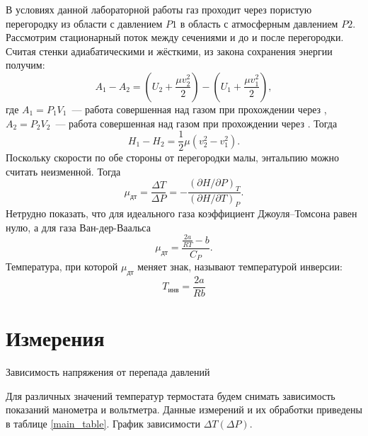 \documentclass[a4paper,12pt]{article} %
\newcommand{\RomanNumeralCaps}[1]
{\MakeUppercase{\romannumeral #1}}
\begin{document}
\noindent В условиях данной лабораторной работы газ проходит через пористую
перегородку из области с давлением $ P1 $ в область с атмосферным давлением 
$ P2 $. Рассмотрим стационарный поток между сечениями \RomanNumeralCaps{1}
и \RomanNumeralCaps{2} до и после перегородки. Считая стенки
адиабатическими и жёсткими, из закона сохранения энергии получим: 
\begin{equation}\label{}
	A_1-A_2=
	\left(U_2+\dfrac{\mu v_2^2}{2}\right)-
	\left(U_1+\dfrac{\mu v_1^2}{2}\right),
\end{equation}
где $ A_1=P_1V_1 $~--- работа совершенная над газом при прохождении
через \RomanNumeralCaps{1}, $ A_2=P_2V_2 $~--- работа совершенная над
газом при прохождении через \RomanNumeralCaps{2}. Тогда
\begin{equation}\label{}
	H_1-H_2=\dfrac{1}{2}\mu(v_2^2-v_1^2).
\end{equation}
Поскольку скорости по обе стороны от перегородки малы, энтальпию можно
считать неизменной. Тогда 
\begin{equation}\label{}
	\mu_{дт}=\dfrac{\Delta T}{\Delta P}=
	-\dfrac{(\partial H/\partial P)_T}{(\partial H/\partial T)_P}.
\end{equation}
Нетрудно показать, что для идеального газа коэффициент Джоуля–Томсона равен
нулю, а для газа Ван-дер-Ваальса 
\begin{equation}\label{}
	\mu_{дт}=\dfrac{\frac{2a}{RT}-b}{C_P}.
\end{equation}
Температура, при которой $ \mu_{дт} $ меняет знак, называют температурой
инверсии: 
\begin{equation}\label{}
	T_{инв}=\dfrac{2a}{Rb}
\end{equation}


\section{Измерения}	 
\begin{table}[h]\centering\small
	
	\caption{Зависимость напряжения от перепада давлений}
	\label{main_table}
\end{table}
\noindent Для различных значений температур термостата будем снимать зависимость
показаний манометра и вольтметра. Данные измерений и их обработки 
приведены в таблице \ref{main_table}. График зависимости $ \Delta T(\Delta P) $.
\end{document}

